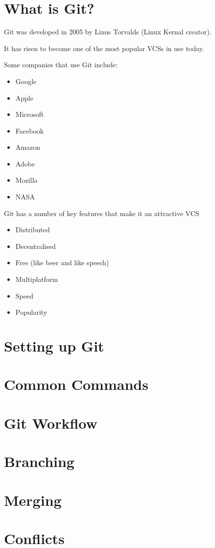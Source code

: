 \documentclass{beamer}
\begin{document}
\section{What is Git?}
\begin{frame}[allowframebreaks]{\secname}
    Git was developed in 2005 by Linus Torvalds (Linux Kernal creator).
    
    It has risen to become one of the most popular VCSs in use today.

    Some companies that use Git include:
    \begin{itemize}
    \item Google
    \item Apple
    \item Microsoft
    \item Facebook
    \item Amazon
    \item Adobe
    \item Mozilla
    \item NASA
    \end{itemize}

\framebreak

    Git has a number of key features that make it an attractive VCS
    \begin{itemize}
    \item Distributed
    \item Decentralised
    \item Free (like beer and like speech)
    \item Multiplatform
    \item Speed
    \item Popularity
    \end{itemize}

\end{frame}

\section{Setting up Git}
\section{Common Commands}
\section{Git Workflow}
\section{Branching}
\section{Merging}
\section{Conflicts}
\end{document}
